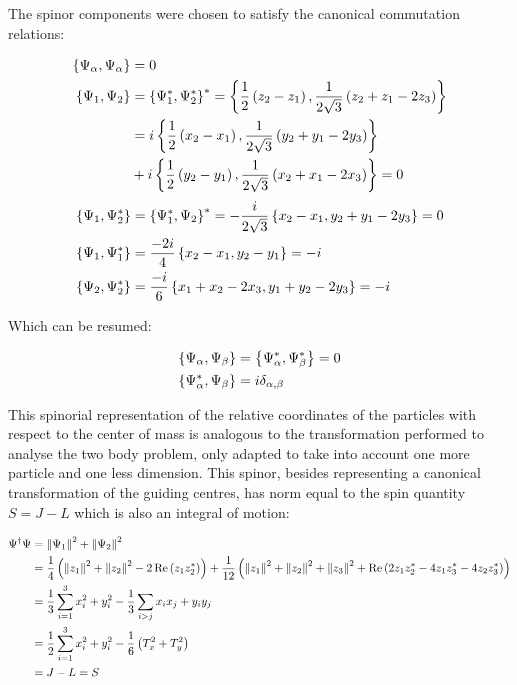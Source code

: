 The spinor components were chosen to satisfy the canonical commutation relations:

\small
\begin{align*}
\left\lbrace \Psi_\alpha, \Psi_\alpha \right\rbrace &= 0\\ 
\left\lbrace \Psi_1, \Psi_2 \right\rbrace &= \left\lbrace \Psi_1^*, \Psi_2^* \right\rbrace^* = \left\lbrace \frac{1}{2}\left( z_{2}-z_{1} \right), \frac{1}{2\sqrt{3}}\left( z_{2}+z_{1}-2z_{3} \right) \right\rbrace \\
&= i\left\lbrace \frac{1}{2}\left( x_{2}-x_{1} \right), \frac{1}{2\sqrt{3}}\left( y_{2}+y_{1}-2y_{3} \right) \right\rbrace\\
&+ i\left\lbrace \frac{1}{2}\left( y_{2}-y_{1} \right), \frac{1}{2\sqrt{3}}\left( x_{2}+x_{1}-2x_{3} \right) \right\rbrace = 0\\
\end{align*}
\small
\begin{align*}
\left\lbrace \Psi_1, \Psi_2^* \right\rbrace &= \left\lbrace \Psi_1^*, \Psi_2 \right\rbrace^* = -\frac{i}{2\sqrt{3}}\left\lbrace x_{2}-x_{1}, y_{2}+y_{1}-2y_{3} \right\rbrace = 0\\
\left\lbrace \Psi_1, \Psi_1^* \right\rbrace &= \frac{-2i}{4}\left\lbrace x_{2}-x_{1}, y_2-y_1 \right\rbrace = -i\\
\left\lbrace \Psi_2, \Psi_2^* \right\rbrace &= \frac{-i}{6}\left\lbrace x_{1}+x_{2}-2x_3, y_1+y_2-2y_3 \right\rbrace = -i
\end{align*}
\normalsize

Which can be resumed:

\begin{align*}
\left\lbrace \Psi_\alpha, \Psi_\beta \right\rbrace &= \left\lbrace \Psi_\alpha^*, \Psi_\beta^* \right\rbrace = 0\\
\left\lbrace \Psi_\alpha^*, \Psi_\beta \right\rbrace &= i\delta_{\alpha,\beta}
\end{align*}

This spinorial representation of the relative coordinates of the particles with respect to the center of mass is analogous to the transformation performed to analyse the two body problem, only adapted to take into account one more particle and one less dimension. This spinor, besides representing a canonical transformation of the guiding centres, has norm equal to the spin quantity $S = J-L$ which is also an integral of motion:

\small
\begin{align*}
\Psi^\dagger\Psi &= \left\lVert \Psi_1 \right\rVert^2 + \left\lVert \Psi_2 \right\rVert^2 \\
&= \frac{1}{4}\left( \left\lVert z_1 \right\rVert^2 + \left\lVert z_2 \right\rVert^2 - 2\operatorname{Re}\left( z_1z_2^* \right) \right) + \frac{1}{12}\left( \left\lVert z_1 \right\rVert^2 + \left\lVert z_2 \right\rVert^2+ \left\lVert z_3 \right\rVert^2 + \operatorname{Re}\left( 2z_1z_2^*- 4z_1z_3^*- 4z_2z_3^* \right) \right)\\
&= \frac{1}{3}\sum_{i=1}^3 x_i^2 + y_i^2 -\frac{1}{3}\sum_{i > j} x_ix_j + y_iy_j\\
&= \frac{1}{2}\sum_{i=1}^3 x_i^2 + y_i^2 - \frac{1}{6}\left( T_x^2+T_y^2 \right)\\
&= J-L = S
\end{align*}
\normalsize

